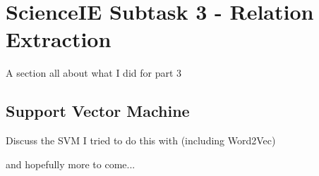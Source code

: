 \section{ScienceIE Subtask 3 - Relation Extraction}
A section all about what I did for part 3
\subsection{Support Vector Machine}
Discuss the SVM I tried to do this with (including Word2Vec)

and hopefully more to come...
